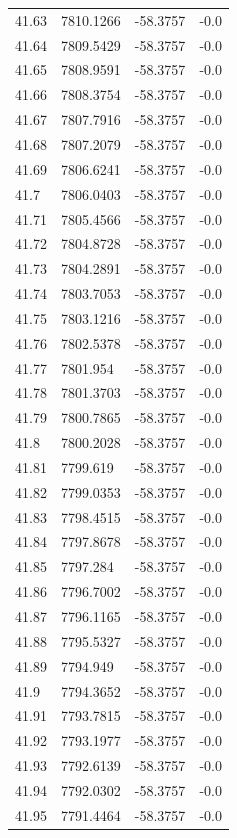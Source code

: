 \begin{table}[H]
\begin{tabular}{llll}
41.63 & 7810.1266 & -58.3757 & -0.0 \\
41.64 & 7809.5429 & -58.3757 & -0.0 \\
41.65 & 7808.9591 & -58.3757 & -0.0 \\
41.66 & 7808.3754 & -58.3757 & -0.0 \\
41.67 & 7807.7916 & -58.3757 & -0.0 \\
41.68 & 7807.2079 & -58.3757 & -0.0 \\
41.69 & 7806.6241 & -58.3757 & -0.0 \\
41.7 & 7806.0403 & -58.3757 & -0.0 \\
41.71 & 7805.4566 & -58.3757 & -0.0 \\
41.72 & 7804.8728 & -58.3757 & -0.0 \\
41.73 & 7804.2891 & -58.3757 & -0.0 \\
41.74 & 7803.7053 & -58.3757 & -0.0 \\
41.75 & 7803.1216 & -58.3757 & -0.0 \\
41.76 & 7802.5378 & -58.3757 & -0.0 \\
41.77 & 7801.954 & -58.3757 & -0.0 \\
41.78 & 7801.3703 & -58.3757 & -0.0 \\
41.79 & 7800.7865 & -58.3757 & -0.0 \\
41.8 & 7800.2028 & -58.3757 & -0.0 \\
41.81 & 7799.619 & -58.3757 & -0.0 \\
41.82 & 7799.0353 & -58.3757 & -0.0 \\
41.83 & 7798.4515 & -58.3757 & -0.0 \\
41.84 & 7797.8678 & -58.3757 & -0.0 \\
41.85 & 7797.284 & -58.3757 & -0.0 \\
41.86 & 7796.7002 & -58.3757 & -0.0 \\
41.87 & 7796.1165 & -58.3757 & -0.0 \\
41.88 & 7795.5327 & -58.3757 & -0.0 \\
41.89 & 7794.949 & -58.3757 & -0.0 \\
41.9 & 7794.3652 & -58.3757 & -0.0 \\
41.91 & 7793.7815 & -58.3757 & -0.0 \\
41.92 & 7793.1977 & -58.3757 & -0.0 \\
41.93 & 7792.6139 & -58.3757 & -0.0 \\
41.94 & 7792.0302 & -58.3757 & -0.0 \\
41.95 & 7791.4464 & -58.3757 & -0.0 \\

\end{tabular}
\end{table}
